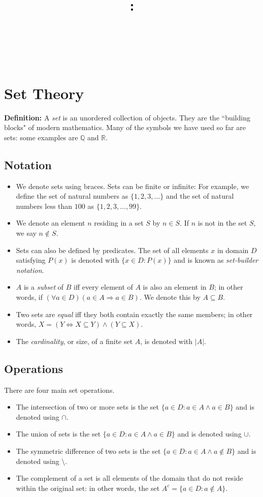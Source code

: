 \documentclass{article}
\title{
    \vspace{2in}
    \textbf{\lectClass:\\ \lectTitle}\\
    \vspace{0.1in}\large{\textit{\lectClassInstructor\ \lectSection}}
    \vspace{3in}
    \author{\textbf{\lectAuthorName}}
    \date{}
}
\begin{document}
\maketitle
\pagebreak

\section*{Set Theory}
    \textbf{Definition:} A \textit{set} is an unordered collection of objects. They are the ``building blocks" of modern mathematics. Many of the symbols we have used so far are sets: some examples are $\mathbb{Q}$ and $\mathbb{R}$.

\subsection*{Notation}
    \begin{itemize}
        \item We denote sets using braces. Sets can be finite or infinite: For example, we define the set of natural numbers as $\{1, 2, 3, \dots\}$ and the set of natural numbers less than $100$ as $\{1, 2, 3, \dots, 99\}$.
        \item We denote an element $n$ residing in a set $S$ by $n \in S$. If $n$ is not in the set $S$, we say $n \notin S$.
        \item Sets can also be defined by predicates. The set of all elements $x$ in domain $D$ satisfying $P(x)$ is denoted with $\{x \in D : P(x)\}$ and is known as \textit{set-builder notation}.
        \item $A$ is a \textit{subset} of $B$ iff every element of $A$ is also an element in $B$; in other words, if $(\forall a \in D)(a \in A \Rightarrow a \in B)$. We denote this by $A \subseteq B$.
        \item Two sets are \textit{equal} iff they both contain exactly the same members; in other words, $X = (Y \iff X \subseteq Y) \land (Y \subseteq X)$.
        \item The \textit{cardinality}, or size, of a finite set $A$, is denoted with $|A|$.
    \end{itemize}
    
\subsection*{Operations}
    There are four main set operations.
    \begin{itemize}
        \item The intersection of two or more sets is the set $\{a \in D : a \in A \land a \in B\}$ and is denoted using $\cap$.
        \item The union of sets is the set $\{a \in D : a \in A \land a \in B\}$ and is denoted using $\cup$.
        \item The symmetric difference of two sets is the set $\{a \in D : a \in A \land a \notin B\}$ and is denoted using $\setminus$.
        \item The complement of a set is all elements of the domain that do not reside within the original set: in other words, the set $A^{c} = \{a \in D : a \notin A\}$.
    \end{itemize}
    
\end{document}
